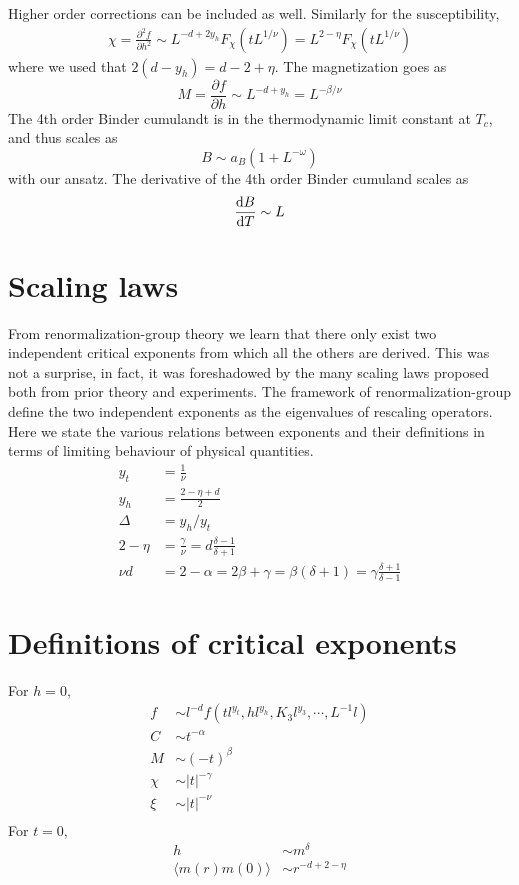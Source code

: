 Higher order corrections can be included as well.
Similarly for the susceptibility,
\begin{align}
  \chi = \frac{\partial^2 f}{\partial h^2}
  \sim L^{-d +2y_h}F_{\chi}(tL^{1/\nu}) = L^{2-\eta}F_{\chi}(tL^{1/\nu})
  \label{}
\end{align}
where we used that $ 2(d-y_h) = d -2 +\eta$.
The magnetization goes as
\begin{equation}
  M = \frac{\partial f}{\partial h} \sim L^{-d + y_h} = L^{-\beta/\nu}
  \label{}
\end{equation}
The 4th order Binder cumulandt is in the thermodynamic limit constant at $T_c$, and thus scales as 
\begin{equation}
  B \sim a_B(1+L^{-\omega})
  \label{}
\end{equation}
with our ansatz.
The derivative of the 4th order Binder cumuland scales as
\begin{equation}
  \frac{\textrm{d} B}{\textrm{d} T}\sim L
  \label{}
\end{equation}

\section{Scaling laws}
From renormalization-group theory we learn that there only exist two independent critical exponents from which all the others are derived.
This was not a surprise, in fact, it was foreshadowed by the many scaling laws proposed both from prior theory and experiments.
The framework of renormalization-group define the two independent exponents as the eigenvalues of rescaling operators.
Here we state the various relations between exponents and their definitions in terms of limiting behaviour of physical quantities.
\begin{align}
  y_t &= \frac{1}{\nu}\\
  y_h &= \frac{2-\eta +d}{2}\\
  \Delta &= y_h/y_t\\
	2 - \eta &= \frac{\gamma}{\nu} = d\frac{\delta -1}{\delta+1}\\
	\nu d &= 2-\alpha = 2\beta + \gamma = \beta(\delta+1) = \gamma\frac{\delta +1}{\delta -1}
\end{align}
\section{Definitions of critical exponents}
For $h=0$,
\begin{align}
  f &\sim l^{-d}f(tl^{y_t},hl^{y_h},K_3l^{y_3},\cdots,L^{-1}l)\\
  C &\sim t^{-\alpha}\\
  M &\sim (-t)^{\beta}\\
  \chi &\sim |t|^{-\gamma}\\
  \xi &\sim |t|^{-\nu}\\
\end{align}  
For $t =0$,
\begin{align}
  h &\sim m^{\delta}\\
  \langle m(r)m(0)\rangle &\sim r^{-d +2 -\eta}
  \label{}
\end{align}
